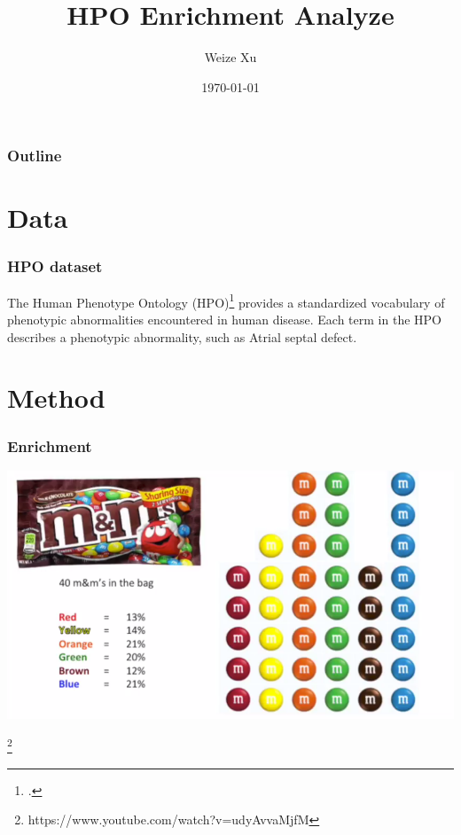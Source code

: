 \documentclass{beamer}
\title{HPO Enrichment Analyze}
\author{Weize Xu}
\institute{Huazhong Agriculture University}
\date{\today}
\begin{document}
\begin{frame}
\titlepage
\end{frame}

\begin{frame}
    \frametitle{Outline}
    \tableofcontents
\end{frame}

\section{Data}

\begin{frame}
    \frametitle{HPO dataset}

    The Human Phenotype Ontology (HPO)\footcite{kohler2018expansion} provides a standardized vocabulary of phenotypic abnormalities encountered in human disease. Each term in the HPO describes a phenotypic abnormality, such as Atrial septal defect.
\end{frame}

\section{Method}

\begin{frame}
    \frametitle{Enrichment}

    \includegraphics[scale=0.2]{mm.png}

    \footnote{https://www.youtube.com/watch?v=udyAvvaMjfM}
    
\end{frame}
\end{document}
